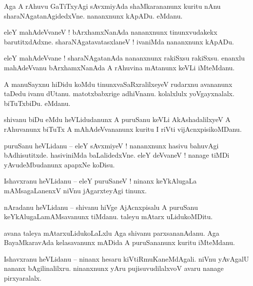 \documentclass{article}
\begin{document}
\begin{mn}%
Aga A rAhuvu GaTiTxyAgi sAvxmiyAda shaMkarananunx kuritu nAnu sharaNAgatanAgidedxVne. nananxnunx 
kApADu. eMdanu.
\end{mn}

\begin{mn}%
eleY mahAdeVvaneV ! bArxhamxNanAda nananxnunx tinunxvudakekx barutitxdAdxne. sharaNAgatavatasxlaneV 
! ivaniMda nananxnunx kApADu.
\end{mn}

\begin{mn}%
eleY mahAdeVvane ! sharaNAgatanAda nananxnunx rakiSxsu rakiSxsu. enanxlu mahAdeVvanu bArxhamxNanAda 
A rAhuvina mAtanunx keVLi iMteMdanu.
\end{mn}

\begin{mn}%
A manuSayxnu hiDidu koMdu tinunxvaSaRxralilxeyeV rudarxnu avananunx taDedu ivanu dUtanu. 
matotxbabxrige adhiVnanu. kolalxlulx yoVgayxnalalx. biTuTxbiDu. eMdanu.
\end{mn}

\begin{mn}%
shivanu biDu eMdu heVLidudanunx A puruSanu keVLi AkAshadalilxyeV A rAhuvanunx biTuTx A 
mAhAdeVvananunx kuritu I riVti vijAcnxpisikoMDanu.
\end{mn}

\begin{mn}%
puruSanu heVLidanu -- eleY sAvxmiyeV ! nananxnunx hasivu bahuvAgi bAdhisutitxde. hasiviniMda 
baLalidedxVne. eleY deVvaneV ! nanage tiMDi yAvudeMbudanunx apapxNe koDisu.
\end{mn}

\begin{mn}%
Ishavxranu heVLidanu -- eleY puruSaneV ! ninanx keYkAlugaLa mAMsagaLanenxV niVnu jAgarxteyAgi tinunx.
\end{mn}

\begin{mn}%
nAradanu heVLidanu -- shivanu hiVge AjAcnxpisalu A puruSanu keYkAlugaLamAMsavanunx tiMdanu. taleyu 
mAtarx uLidukoMDitu.
\end{mn}

\begin{mn}%
avana taleya mAtarxuLidukoLaLxlu Aga shivanu parxsananAdanu. Aga BayaMkaravAda kelasavanunx mADida 
A puruSananunx kuritu iMteMdanu.
\end{mn}

\begin{mn}%
Ishavxranu heVLidanu -- ninanx hesaru kiVtiRmuKaneMdAgali. niVnu yAvAgalU nananx bAgilinalilxru. 
ninanxnunx yAru pujisuvudilalxvoV avaru nanage pirxyaralalx.
\end{mn}
\end{document}

